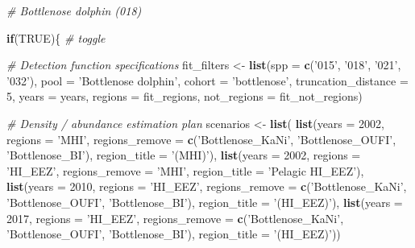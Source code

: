 \documentclass[
]{book}
\newenvironment{Shaded}{\begin{snugshade}}{\end{snugshade}}
\newcommand{\CommentTok}[1]{\textcolor[rgb]{0.56,0.35,0.01}{\textit{#1}}}
\newcommand{\ControlFlowTok}[1]{\textcolor[rgb]{0.13,0.29,0.53}{\textbf{#1}}}
\newcommand{\DataTypeTok}[1]{\textcolor[rgb]{0.13,0.29,0.53}{#1}}
\newcommand{\DecValTok}[1]{\textcolor[rgb]{0.00,0.00,0.81}{#1}}
\newcommand{\KeywordTok}[1]{\textcolor[rgb]{0.13,0.29,0.53}{\textbf{#1}}}
\newcommand{\NormalTok}[1]{#1}
\newcommand{\OtherTok}[1]{\textcolor[rgb]{0.56,0.35,0.01}{#1}}
\newcommand{\StringTok}[1]{\textcolor[rgb]{0.31,0.60,0.02}{#1}}
\begin{document}
\begin{Shaded}
\begin{Highlighting}[]
\CommentTok{# Bottlenose dolphin (018)}

\ControlFlowTok{if}\NormalTok{(}\OtherTok{TRUE}\NormalTok{)\{ }\CommentTok{# toggle}

  \CommentTok{# Detection function specifications}
\NormalTok{  fit_filters <-}
\StringTok{    }\KeywordTok{list}\NormalTok{(}\DataTypeTok{spp =} \KeywordTok{c}\NormalTok{(}\StringTok{'015'}\NormalTok{, }\StringTok{'018'}\NormalTok{, }\StringTok{'021'}\NormalTok{, }\StringTok{'032'}\NormalTok{),}
         \DataTypeTok{pool =} \StringTok{'Bottlenose dolphin'}\NormalTok{,}
         \DataTypeTok{cohort =} \StringTok{'bottlenose'}\NormalTok{,}
         \DataTypeTok{truncation_distance =} \DecValTok{5}\NormalTok{,}
         \DataTypeTok{years =}\NormalTok{ years,}
         \DataTypeTok{regions =}\NormalTok{ fit_regions,}
         \DataTypeTok{not_regions =}\NormalTok{ fit_not_regions)}

  \CommentTok{# Density / abundance estimation plan}
\NormalTok{  scenarios <-}\StringTok{ }\KeywordTok{list}\NormalTok{(}
    \KeywordTok{list}\NormalTok{(}\DataTypeTok{years =} \DecValTok{2002}\NormalTok{,}
       \DataTypeTok{regions =} \StringTok{'MHI'}\NormalTok{,}
       \DataTypeTok{regions_remove =} \KeywordTok{c}\NormalTok{(}\StringTok{'Bottlenose_KaNi'}\NormalTok{, }\StringTok{'Bottlenose_OUFI'}\NormalTok{, }\StringTok{'Bottlenose_BI'}\NormalTok{),}
       \DataTypeTok{region_title =} \StringTok{'(MHI)'}\NormalTok{),}
    \KeywordTok{list}\NormalTok{(}\DataTypeTok{years =} \DecValTok{2002}\NormalTok{, }
         \DataTypeTok{regions =} \StringTok{'HI_EEZ'}\NormalTok{,}
         \DataTypeTok{regions_remove =} \StringTok{'MHI'}\NormalTok{,}
         \DataTypeTok{region_title =} \StringTok{'Pelagic HI_EEZ'}\NormalTok{),}
    \KeywordTok{list}\NormalTok{(}\DataTypeTok{years =} \DecValTok{2010}\NormalTok{,}
         \DataTypeTok{regions =} \StringTok{'HI_EEZ'}\NormalTok{,}
         \DataTypeTok{regions_remove =} \KeywordTok{c}\NormalTok{(}\StringTok{'Bottlenose_KaNi'}\NormalTok{, }\StringTok{'Bottlenose_OUFI'}\NormalTok{, }\StringTok{'Bottlenose_BI'}\NormalTok{),}
       \DataTypeTok{region_title =} \StringTok{'(HI_EEZ)'}\NormalTok{),}
    \KeywordTok{list}\NormalTok{(}\DataTypeTok{years =} \DecValTok{2017}\NormalTok{,}
         \DataTypeTok{regions =} \StringTok{'HI_EEZ'}\NormalTok{,}
         \DataTypeTok{regions_remove =} \KeywordTok{c}\NormalTok{(}\StringTok{'Bottlenose_KaNi'}\NormalTok{, }\StringTok{'Bottlenose_OUFI'}\NormalTok{, }\StringTok{'Bottlenose_BI'}\NormalTok{),}
       \DataTypeTok{region_title =} \StringTok{'(HI_EEZ)'}\NormalTok{))}
  

\end{Highlighting}
\end{Shaded}
\end{document}
